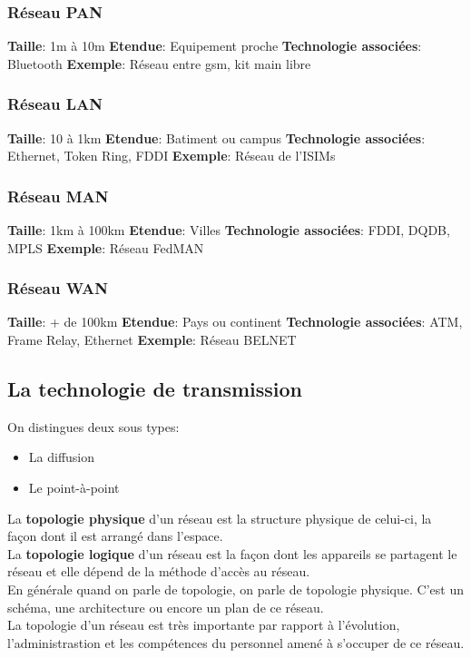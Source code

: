 \documentclass[10pt,a4paper]{article}
\begin{document}
 \subsubsection{Réseau PAN}
 \textbf{Taille}: 1m à 10m
 \textbf{Etendue}: Equipement proche
 \textbf{Technologie associées}: Bluetooth
 \textbf{Exemple}: Réseau entre gsm, kit main libre

 \subsubsection{Réseau LAN}
 \textbf{Taille}: 10 à 1km
 \textbf{Etendue}: Batiment ou campus
 \textbf{Technologie associées}: Ethernet, Token Ring, FDDI
 \textbf{Exemple}: Réseau de l'ISIMs

 \subsubsection{Réseau MAN}
 \textbf{Taille}: 1km à 100km
 \textbf{Etendue}: Villes
 \textbf{Technologie associées}: FDDI, DQDB, MPLS
 \textbf{Exemple}: Réseau FedMAN

 \subsubsection{Réseau WAN}
 \textbf{Taille}: + de 100km
 \textbf{Etendue}: Pays ou continent
 \textbf{Technologie associées}: ATM, Frame Relay, Ethernet
 \textbf{Exemple}: Réseau BELNET

 \subsection{La technologie de transmission}
 On distingues deux sous types:
 \begin{itemize}
	 \item La diffusion
	 \item Le point-à-point
 \end{itemize}
 La \textbf{topologie physique} d'un réseau est la structure physique de celui-ci, la façon dont il est arrangé dans l'espace.\\
 La \textbf{topologie logique} d'un réseau est la façon dont les appareils se partagent le réseau et elle dépend de la méthode d'accès au réseau.\\
 En générale quand on parle de topologie, on parle de topologie physique. C'est un schéma, une architecture ou encore un plan de ce réseau.\\
 La topologie d'un réseau est très importante par rapport à l'évolution, l'administrastion et les compétences du personnel amené à s'occuper de ce réseau.
\end{document}
